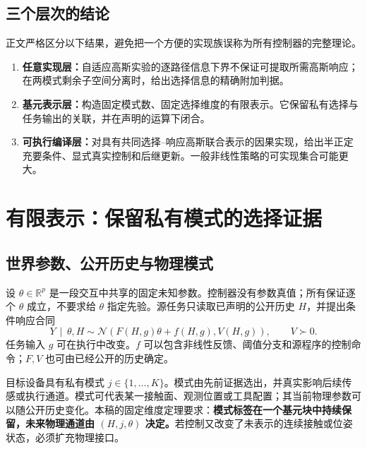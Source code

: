 \documentclass[UTF8,fontset=fandol,11pt,a4paper]{ctexart}
\newcommand{\R}{\mathbb R}
\newcommand{\N}{\mathcal N}
\newcommand{\given}{\,\mid\,}
\theoremstyle{definition}
\theoremstyle{remark}
\numberwithin{equation}{section}
\begin{document}
\subsection{三个层次的结论}
正文严格区分以下结果，避免把一个方便的实现族误称为所有控制器的完整理论。
\begin{enumerate}
\item \textbf{任意实现层：}自适应高斯实验的逐路径信息下界不保证可提取所需高斯响应；在两模式剩余子空间分离时，给出选择信息的精确附加判据。
\item \textbf{基元表示层：}构造固定模式数、固定选择维度的有限表示。它保留私有选择与任务输出的关联，并在声明的运算下闭合。
\item \textbf{可执行编译层：}对具有共同选择--响应高斯联合表示的因果实现，给出半正定充要条件、显式真实控制和后继更新。一般非线性策略的可实现集合可能更大。
\end{enumerate}

\section{有限表示：保留私有模式的选择证据}
\label{sec:selected-representation}

\subsection{世界参数、公开历史与物理模式}
设 $\theta\in\R^p$ 是一段交互中共享的固定未知参数。控制器没有参数真值；所有保证逐个 $\theta$ 成立，不要求给 $\theta$ 指定先验。源任务只读取已声明的公开历史 $H$，并提出条件响应合同
\begin{equation}
 Y\given\theta,H\sim\N(F(H,g)\theta+f(H,g),V(H,g)),\qquad V\succ0.
 \label{eq:sel-contract}
\end{equation}
任务输入 $g$ 可在执行中改变。$f$ 可以包含非线性反馈、阈值分支和源程序的控制命令；$F,V$ 也可由已经公开的历史确定。

目标设备具有私有模式 $j\in\{1,\ldots,K\}$。模式由先前证据选出，并真实影响后续传感或执行通道。模式可代表某一接触面、观测位置或工具配置；其当前物理参数可以随公开历史变化。本稿的固定维度定理要求：\textbf{模式标签在一个基元块中持续保留，未来物理通道由 $(H,j,\theta)$ 决定。}若控制又改变了未表示的连续接触或位姿状态，必须扩充物理接口。
\end{document}
